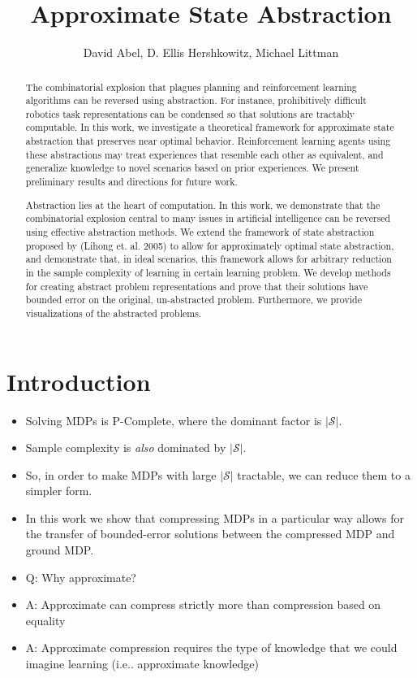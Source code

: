 \documentclass[11pt]{article}
\title{Approximate State Abstraction}
\author{David Abel, D. Ellis Hershkowitz, Michael Littman}
\date{}                                           %
\begin{document}
\maketitle


\begin{abstract}
The combinatorial explosion that plagues planning and reinforcement learning algorithms can be reversed using abstraction. For instance, prohibitively difficult robotics task representations can be condensed so that solutions are tractably computable. In this work, we investigate a theoretical framework for approximate state abstraction that preserves near optimal behavior. Reinforcement learning agents using these abstractions may treat experiences that resemble each other as equivalent, and generalize knowledge to novel scenarios based on prior experiences. We present preliminary results and directions for future work.

Abstraction lies at the heart of computation. In this work, we demonstrate that the combinatorial explosion central to many issues in artificial intelligence can be reversed using effective abstraction methods. We extend the framework of state abstraction proposed by (Lihong et. al. 2005) to allow for approximately optimal state abstraction, and demonstrate that, in ideal scenarios, this framework allows for arbitrary reduction in the sample complexity of learning in certain learning problem. We develop methods for creating abstract problem representations and prove that their solutions have bounded error on the original, un-abstracted problem. Furthermore, we provide visualizations of the abstracted problems.

\end{abstract}



\section{Introduction}

\begin{itemize}
\item Solving MDPs is P-Complete, where the dominant factor is $|\mathcal{S}|$.
\item Sample complexity is {\it also} dominated by $|\mathcal{S}|$.
\item So, in order to make MDPs with large $|\mathcal{S}|$ tractable, we can reduce them to a simpler form.
\item In this work we show that compressing MDPs in a particular way allows for the transfer of bounded-error solutions between the compressed MDP and ground MDP.
\item Q: Why approximate?
\item A: Approximate can compress strictly more than compression based on equality
\item A: Approximate compression requires the type of knowledge that we could imagine learning (i.e.. approximate knowledge)
\end{itemize}
\end{document}
